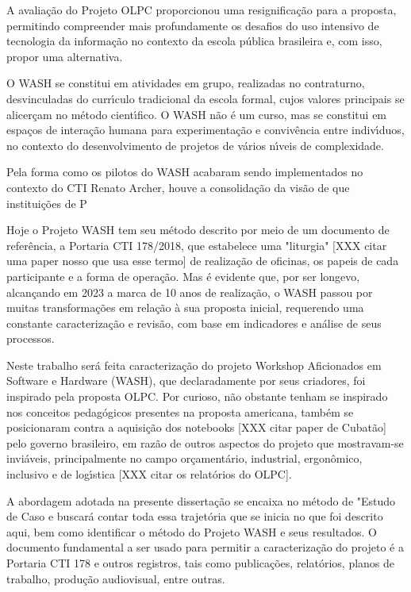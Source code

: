 \documentclass[
12pt,		%
openright,	%
twoside,  %
a4paper,			%
chapter=TITLE,		%
english,			%
french,				%
spanish,			%
brazil				%
]{USPSC-classe/USPSC}
\begin{document}
A avalia\c{c}\~ao do Projeto OLPC proporcionou uma resignifica\c{c}\~ao para a proposta, permitindo compreender mais profundamente os desafios do uso intensivo de tecnologia da informa\c{c}\~ao no contexto da escola p\'ublica brasileira e, com isso, propor uma alternativa.


O WASH se constitui em atividades em grupo, realizadas no contraturno, desvinculadas do curr\'{\i}culo tradicional da escola formal, cujos valores principais se alicer\c{c}am no m\'etodo cient\'{\i}fico. O WASH n\~ao \'e um curso, mas se constitui em espa\c{c}os de intera\c{c}\~ao humana para experimenta\c{c}\~ao e conviv\^encia entre indiv\'{\i}duos, no contexto do desenvolvimento de projetos de v\'arios n\'{\i}veis de complexidade.


Pela forma como os pilotos do WASH acabaram sendo implementados no contexto do CTI Renato Archer, houve a consolida\c{c}\~ao da vis\~ao de que institui\c{c}\~oes de P


Hoje o Projeto WASH tem seu m\'etodo descrito por meio de um documento de refer\^encia, a Portaria CTI 178/2018, que estabelece uma "liturgia" [XXX citar uma paper nosso que usa esse termo] de realiza\c{c}\~ao de oficinas, os papeis de cada participante e a forma de opera\c{c}\~ao. Mas \'e evidente que, por ser longevo, alcan\c{c}ando em 2023 a marca de 10 anos de realiza\c{c}\~ao, o WASH passou por muitas transforma\c{c}\~oes em rela\c{c}\~ao \`a sua proposta inicial, requerendo uma constante caracteriza\c{c}\~ao e revis\~ao, com base em indicadores e an\'alise de seus processos.


Neste trabalho ser\'a feita caracteriza\c{c}\~ao do projeto Workshop Aficionados em Software e Hardware (WASH), que declaradamente por seus criadores, foi inspirado pela proposta OLPC. Por curioso, n\~ao obstante tenham se inspirado nos conceitos pedag\'ogicos presentes na proposta americana, tamb\'em se posicionaram contra a aquisi\c{c}\~ao dos notebooks [XXX citar paper de Cubat\~ao] pelo governo brasileiro, em raz\~ao de outros aspectos do projeto que mostravam-se invi\'aveis, principalmente no campo or\c{c}ament\'ario, industrial, ergon\^omico, inclusivo e de log\'{\i}stica [XXX citar os relat\'orios do OLPC].


A abordagem adotada na presente disserta\c{c}\~ao se encaixa no m\'etodo de "Estudo de Caso e buscar\'a contar toda essa trajet\'oria que se inicia no que foi descrito aqui, bem como identificar o m\'etodo do Projeto WASH e seus resultados. O documento fundamental a ser usado para permitir a caracteriza\c{c}\~ao do projeto \'e a Portaria CTI 178 e outros registros, tais como publica\c{c}\~oes, relat\'orios, planos de trabalho, produ\c{c}\~ao audiovisual, entre outras.
\end{document}
